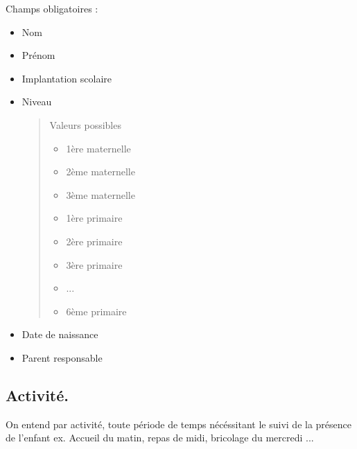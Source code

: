 \documentclass[letterpaper,10pt,english]{sphinxmanual}
\begin{document}
Champs obligatoires :
\begin{itemize}
\item {} 
Nom

\item {} 
Prénom

\item {} 
Implantation scolaire

\item {} 
Niveau
\begin{quote}

Valeurs possibles
\begin{itemize}
\item {} 
1ère maternelle

\item {} 
2ème maternelle

\item {} 
3ème maternelle

\item {} 
1ère primaire

\item {} 
2ère primaire

\item {} 
3ère primaire

\item {} 
...

\item {} 
6ème primaire

\end{itemize}
\end{quote}

\item {} 
Date de naissance

\item {} 
Parent responsable

\end{itemize}


\subsection{Activité.}
\label{checklist:activite}
On entend par activité, toute période de temps nécéssitant le suivi de la présence de l'enfant
ex. Accueil du matin, repas de midi, bricolage du mercredi ...
\end{document}
